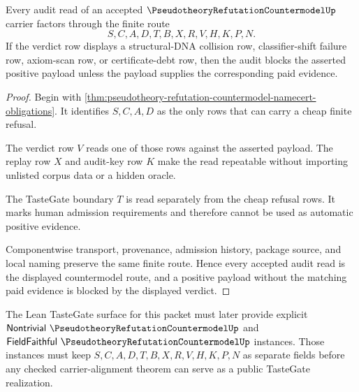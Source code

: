 \begin{theorem}
\label{thm:pseudotheory-refutation-countermodel-audit-route}
Every audit read of an accepted
$\PseudotheoryRefutationCountermodelUp$ carrier factors through the finite
route
$$
S,C,A,D,T,B,X,R,V,H,K,P,N .
$$
If the verdict row displays a structural-DNA collision row, classifier-shift
failure row, axiom-scan row, or certificate-debt row, then the audit blocks the
asserted positive payload unless the payload supplies the corresponding paid
evidence.
\end{theorem}
\begin{proof}
Begin with
\autoref{thm:pseudotheory-refutation-countermodel-namecert-obligations}. It
identifies $S,C,A,D$ as the only rows that can carry a cheap finite refusal.

The verdict row $V$ reads one of those rows against the asserted payload. The
replay row $X$ and audit-key row $K$ make the read repeatable without importing
unlisted corpus data or a hidden oracle.

The TasteGate boundary $T$ is read separately from the cheap refusal rows. It
marks human admission requirements and therefore cannot be used as automatic
positive evidence.

Componentwise transport, provenance, admission history, package source, and
local naming preserve the same finite route. Hence every accepted audit read is
the displayed countermodel route, and a positive payload without the matching
paid evidence is blocked by the displayed verdict.
\end{proof}



The Lean TasteGate surface for this packet must later provide explicit
$\mathsf{Nontrivial}\ \PseudotheoryRefutationCountermodelUp$ and
$\mathsf{FieldFaithful}\ \PseudotheoryRefutationCountermodelUp$ instances. Those
instances must keep $S,C,A,D,T,B,X,R,V,H,K,P,N$ as separate fields before any
checked carrier-alignment theorem can serve as a public TasteGate realization.

